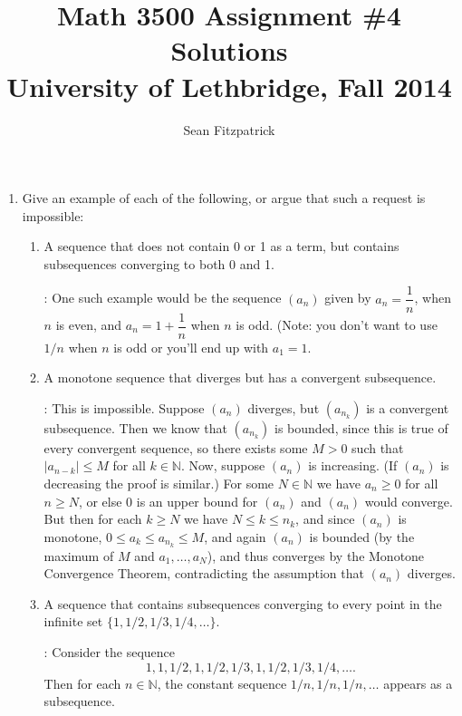 \documentclass[letterpaper,12pt]{article}
\title{Math 3500 Assignment \#4 Solutions\\University of Lethbridge, Fall 2014}
\author{Sean Fitzpatrick}
\newcommand{\N}{\mathbb{N}}
\newcommand{\abs}[1]{\lvert #1\rvert}
\begin{document}
 \maketitle

\begin{enumerate}
 \item Give an example of each of the following, or argue that such a request is impossible:
\begin{enumerate}
 \item A sequence that does not contain 0 or 1 as a term, but contains subsequences converging to both 0 and 1.

\bigskip

: One such example would be the sequence $(a_n)$ given by $a_n = \dfrac{1}{n}$, when $n$ is even, and $a_n = 1+\dfrac{1}{n}$ when $n$ is odd. (Note: you don't want to use $1/n$ when $n$ is odd or you'll end up with $a_1=1$. 


\bigskip

 \item A monotone sequence that diverges but has a convergent subsequence.

\bigskip

: This is impossible. Suppose $(a_n)$ diverges, but $(a_{n_k})$ is a convergent subsequence. Then we know that $(a_{n_k})$ is bounded, since this is true of every convergent sequence, so there exists some $M>0$ such that $\abs{a_{n-k}}\leq M$ for all $k\in\N$. Now, suppose $(a_n)$ is increasing. (If $(a_n)$ is decreasing the proof is similar.) For some $N\in\N$ we have $a_n\geq 0$ for all $n\geq N$, or else 0 is an upper bound for $(a_n)$ and $(a_n)$ would converge. But then for each $k\geq N$ we have $N\leq k\leq n_k$, and since $(a_n)$ is monotone, $0\leq a_k\leq a_{n_k}\leq M$, and again $(a_n)$ is bounded (by the maximum of $M$ and $a_1,\ldots, a_N$), and thus converges by the Monotone Convergence Theorem, contradicting the assumption that $(a_n)$ diverges.

\bigskip

 \item A sequence that contains subsequences converging to every point in the infinite set $\{1,1/2, 1/3, 1/4, \ldots\}$.

\bigskip

: Consider the sequence
\[
 1,1,1/2, 1, 1/2, 1/3, 1, 1/2, 1/3, 1/4, \ldots .
\]
Then for each $n\in\N$, the constant sequence $1/n, 1/n, 1/n,\ldots$ appears as a subsequence.


\end{enumerate}
\end{enumerate}
\end{document}

